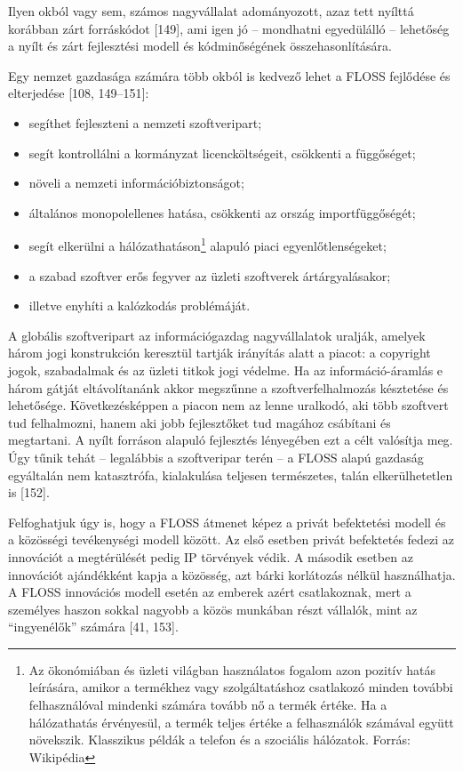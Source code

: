 \documentclass[12pt,magyar,a4paper,oneside]{scrreprt}
\providecommand{\tightlist}{%
  \setlength{\itemsep}{0pt}\setlength{\parskip}{0pt}}
\begin{document}
Ilyen okból vagy sem, számos nagyvállalat adományozott, azaz tett
nyílttá korábban zárt forráskódot {[}149{]}, ami igen jó -- mondhatni
egyedülálló -- lehetőség a nyílt és zárt fejlesztési modell és
kódminőségének összehasonlítására.

Egy nemzet gazdasága számára több okból is kedvező lehet a FLOSS
fejlődése és elterjedése {[}108, 149--151{]}:

\begin{itemize}
\tightlist
\item
  segíthet fejleszteni a nemzeti szoftveripart;
\item
  segít kontrollálni a kormányzat licencköltségeit, csökkenti a
  függőséget;
\item
  növeli a nemzeti információbiztonságot;
\item
  általános monopolellenes hatása, csökkenti az ország importfüggőségét;
\item
  segít elkerülni a hálózathatáson\footnote{Az ökonómiában és üzleti
    világban használatos fogalom azon pozitív hatás leírására, amikor a
    termékhez vagy szolgáltatáshoz csatlakozó minden további
    felhasználóval mindenki számára tovább nő a termék értéke. Ha a
    hálózathatás érvényesül, a termék teljes értéke a felhasználók
    számával együtt növekszik. Klasszikus példák a telefon és a
    szociális hálózatok. Forrás: Wikipédia} alapuló piaci
  egyenlőtlenségeket;
\item
  a szabad szoftver erős fegyver az üzleti szoftverek ártárgyalásakor;
\item
  illetve enyhíti a kalózkodás problémáját.
\end{itemize}

A globális szoftveripart az információgazdag nagyvállalatok uralják,
amelyek három jogi konstrukción keresztül tartják irányítás alatt a
piacot: a copyright jogok, szabadalmak és az üzleti titkok jogi védelme.
Ha az információ-áramlás e három gátját eltávolítanánk akkor megszűnne a
szoftverfelhalmozás késztetése és lehetősége. Következésképpen a piacon
nem az lenne uralkodó, aki több szoftvert tud felhalmozni, hanem aki
jobb fejlesztőket tud magához csábítani és megtartani. A nyílt forráson
alapuló fejlesztés lényegében ezt a célt valósítja meg. Úgy tűnik tehát
-- legalábbis a szoftveripar terén -- a FLOSS alapú gazdaság egyáltalán
nem katasztrófa, kialakulása teljesen természetes, talán elkerülhetetlen
is {[}152{]}.

Felfoghatjuk úgy is, hogy a FLOSS átmenet képez a privát befektetési
modell és a közösségi tevékenységi modell között. Az első esetben privát
befektetés fedezi az innovációt a megtérülését pedig IP törvények védik.
A második esetben az innovációt ajándékként kapja a közösség, azt bárki
korlátozás nélkül használhatja. A FLOSS innovációs modell esetén az
emberek azért csatlakoznak, mert a személyes haszon sokkal nagyobb a
közös munkában részt vállalók, mint az ``ingyenélők'' számára {[}41,
153{]}.
\end{document}
